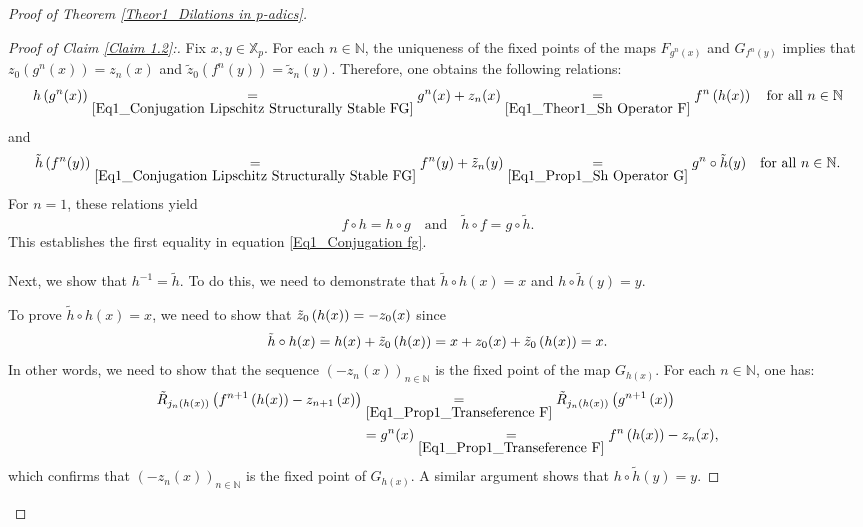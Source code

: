 \documentclass[a4paper, 12pt]{article}
\theoremstyle{definition}
\begin{document}
\begin{proof}[Proof of Theorem \ref{Theor1_Dilations in p-adics}]
\begin{proof}[Proof of Claim \ref{Claim 1.2}:]
			Fix $x, y \in \mathbb{X}_{p}$. 
			For each $n \in \mathbb{N} $,  the uniqueness of the fixed points of the maps $F_{g^{n}(x)}$ and $G_{f^{n}(y)}$ implies that $z_{0} \left(  g^{n}(x)  \right)  = z_{n}(x)$ and $\tilde{z}_{0} \left(  f^{n}(y)  \right)  = \tilde{z}_{n} \left(  y  \right) $. 
			Therefore, one obtains the following relations:   		
			\begin{equation}\label{Eq1_Prop1_Transeference F}
				h \left(  g^{n}(x)  \right)    \underset{\eqref{Eq1_Conjugation Lipschitz Structurally Stable FG}}{=}   g^{n}(x) + z_{n}(x)   \underset{\eqref{Eq1_Theor1_Sh Operator F}}{=}    f^{n} \left(  h(x)  \right)   \quad \text{for all } n \in \mathbb{N} 
			\end{equation}
			and
			\begin{equation}\label{Eq1_Prop1_Transeference G}
				\Tilde{h} \left(  f^{n}(y)  \right)     \underset{\eqref{Eq1_Conjugation Lipschitz Structurally Stable FG}}{=}   f^{n}(y) + \Tilde{z}_{n}(y)   \underset{\eqref{Eq1_Prop1_Sh Operator G}}{=}   g^{n} \circ \Tilde{h} (y)  \quad \text{for all } n \in \mathbb{N}  . 
			\end{equation}
			For $n=1$, these relations yield  
			\begin{equation*}\label{Eq1_Prop1_Conjugations h and tilde h}
				f \circ h   =   h \circ g \quad \text{and} \quad \tilde{h} \circ f   =   g \circ \tilde{h}. 
			\end{equation*}
			This establishes the first equality in equation \eqref{Eq1_Conjugation fg}. 
			
			
			\paragraph{}
			Next, we show that $h^{-1} = \tilde{h}$. To do this, we need to demonstrate that $\tilde{h} \circ h (x) = x$ and $ h \circ \tilde{h}(y) = y$. 
			
			To prove $\tilde{h}\circ h(x)=x $, we need to show that $\Tilde{z}_{0} \left(  h(x)  \right)  = - z_{0}(x)$ since  
			$$ \Tilde{h}\circ h(x)    =     h(x) + \Tilde{z}_{0} \left(  h(x)  \right)     =    x + z_{0}(x) + \Tilde{z}_{0} \left(  h(x)  \right)      =     x .$$
			In other words, we need to show that the sequence $ \left(  - z_{n}(x)   \right)_{n \in \mathbb{N} }$ is the fixed point of the map $G_{h(x)}$. For each $n \in \mathbb{N} $, one has: 
			\begin{align*}
				\tilde{R}_{j_{n} \left(  h(x)  \right) } \left(  f^{n+1} \left(  h(x)  \right)  - z_{n+1} \left(  x  \right)   \right)    & \underset{\eqref{Eq1_Prop1_Transeference F}}{=}   \tilde{R}_{j_{n} \left(  h(x)  \right) } \left(  g^{n+1} \left(  x  \right)   \right)   \\  
				& =   g^{n}(x)   \underset{\eqref{Eq1_Prop1_Transeference F}}{=}   f^{n} \left(  h (x)  \right)  - z_{n}(x),
			\end{align*}
			which confirms that $ \left(  - z_{n}(x)   \right)_{n \in \mathbb{N} }$ is the fixed point of $G_{h(x)}$. A similar argument shows that $h \circ \tilde{h}(y) = y$. 
			

\end{proof}
\end{proof}
\end{document}
